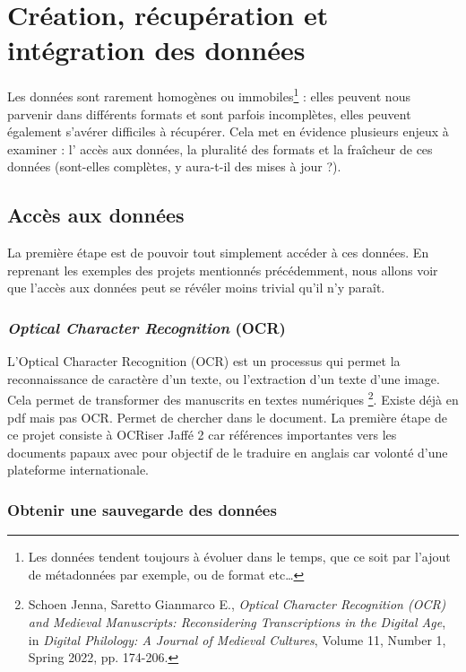     \chapter{Création, récupération et intégration des données}

Les données sont rarement homogènes ou immobiles\footnote{Les données tendent toujours à évoluer dans le temps, que ce soit par l’ajout de métadonnées par exemple, ou de format etc…} : elles peuvent nous parvenir dans différents formats et sont parfois incomplètes, elles peuvent également s’avérer difficiles à récupérer. Cela met en évidence plusieurs enjeux à examiner :  l’ accès aux données, la pluralité des  formats et la fraîcheur de  ces données (sont-elles complètes, y aura-t-il des mises à jour ?).


    \section{Accès aux données}

La première étape est de pouvoir tout simplement accéder à ces données. En reprenant les exemples des projets mentionnés précédemment, nous allons voir que l’accès aux données peut se révéler moins trivial qu’il n’y paraît.

    \subsection{\textit{Optical Character Recognition} (OCR)}

L’Optical Character Recognition (OCR) est un processus qui permet la reconnaissance de caractère d’un texte, ou l’extraction d’un texte d’une image. Cela permet de transformer des manuscrits en textes numériques \footnote{Schoen Jenna, Saretto Gianmarco E., \textit{Optical Character Recognition (OCR) and Medieval Manuscripts: Reconsidering Transcriptions in the Digital Age}, in \textit{Digital Philology: A Journal of Medieval Cultures}, Volume 11, Number 1, Spring 2022, pp. 174-206.}. 
Existe déjà en pdf mais pas OCR. Permet de chercher dans le document. La première étape de ce projet consiste à OCRiser Jaffé 2 car références importantes vers les documents papaux avec pour objectif de le traduire en anglais car volonté d’une plateforme internationale.


    
    \subsection{Obtenir une sauvegarde des données}

